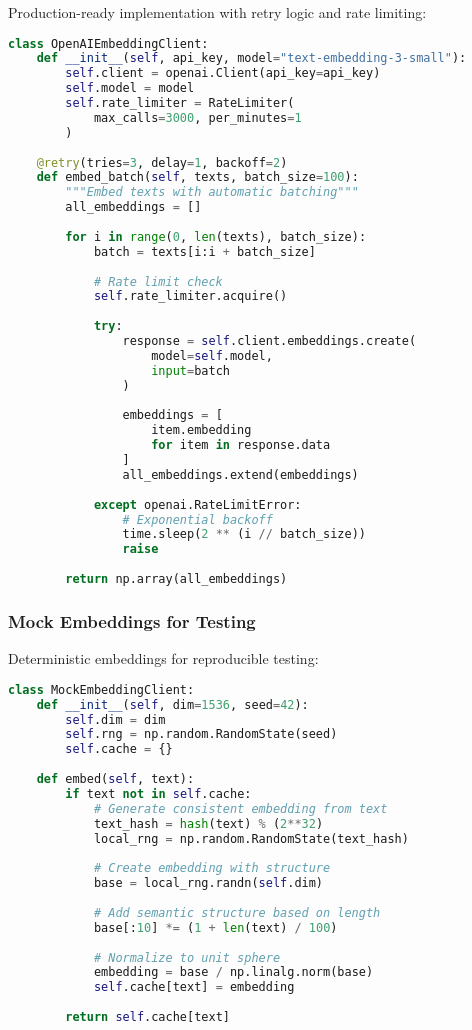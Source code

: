 \documentclass[conference]{IEEEtran}
\begin{document}
Production-ready implementation with retry logic and rate limiting:

\begin{lstlisting}[language=Python, basicstyle=\small]
class OpenAIEmbeddingClient:
    def __init__(self, api_key, model="text-embedding-3-small"):
        self.client = openai.Client(api_key=api_key)
        self.model = model
        self.rate_limiter = RateLimiter(
            max_calls=3000, per_minutes=1
        )
    
    @retry(tries=3, delay=1, backoff=2)
    def embed_batch(self, texts, batch_size=100):
        """Embed texts with automatic batching"""
        all_embeddings = []
        
        for i in range(0, len(texts), batch_size):
            batch = texts[i:i + batch_size]
            
            # Rate limit check
            self.rate_limiter.acquire()
            
            try:
                response = self.client.embeddings.create(
                    model=self.model,
                    input=batch
                )
                
                embeddings = [
                    item.embedding
                    for item in response.data
                ]
                all_embeddings.extend(embeddings)
                
            except openai.RateLimitError:
                # Exponential backoff
                time.sleep(2 ** (i // batch_size))
                raise
        
        return np.array(all_embeddings)
\end{lstlisting}

\subsubsection{Mock Embeddings for Testing}

Deterministic embeddings for reproducible testing:

\begin{lstlisting}[language=Python, basicstyle=\small]
class MockEmbeddingClient:
    def __init__(self, dim=1536, seed=42):
        self.dim = dim
        self.rng = np.random.RandomState(seed)
        self.cache = {}
    
    def embed(self, text):
        if text not in self.cache:
            # Generate consistent embedding from text
            text_hash = hash(text) % (2**32)
            local_rng = np.random.RandomState(text_hash)
            
            # Create embedding with structure
            base = local_rng.randn(self.dim)
            
            # Add semantic structure based on length
            base[:10] *= (1 + len(text) / 100)
            
            # Normalize to unit sphere
            embedding = base / np.linalg.norm(base)
            self.cache[text] = embedding
        
        return self.cache[text]
\end{lstlisting}
\end{document}
